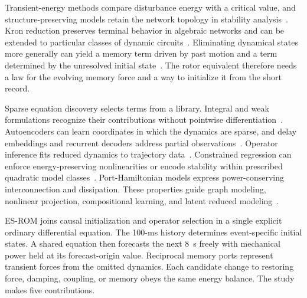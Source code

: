 Transient-energy methods compare disturbance energy with a critical
value, and structure-preserving models retain the network topology in
stability analysis~\cite{athay1979energy,bergen1981structure}. Kron reduction
preserves terminal behavior in algebraic networks and can be extended to
particular classes of dynamic circuits~\cite{dorfler2013kron,caliskan2014kron}.
Eliminating dynamical states more generally can yield a memory term driven
by past motion and a term determined by the unresolved initial
state~\cite{mori1965memory,gouasmi2017memory,pagnier2025kron}. The rotor
equivalent therefore needs a law for the evolving memory force and a way
to initialize it from the short record.

Sparse equation discovery selects terms from a library. Integral and weak
formulations recognize their contributions without pointwise
differentiation~\cite{brunton2016sindy,schaeffer2017integral,messenger2021weak}.
Autoencoders can learn coordinates in which the dynamics are sparse, and
delay embeddings and recurrent decoders address partial
observations~\cite{champion2019coordinates,bakarji2023delay,gao2026shred}.
Operator inference fits reduced dynamics to trajectory data~\cite{peherstorfer2016opinf}. Constrained regression can enforce
energy-preserving nonlinearities or encode stability within prescribed
quadratic model classes~\cite{loiseau2018galerkin,goyal2025quadratic}.
Port-Hamiltonian models express power-conserving interconnection and
dissipation. These properties guide graph modeling, nonlinear projection,
compositional learning, and latent reduced modeling~\cite{vanderschaft2013graphs,chaturantabut2016ph,neary2023compositional,rettberg2025latent}.

ES-ROM joins causal initialization and operator selection in a single
explicit ordinary differential equation. The 100-ms history determines
event-specific initial states. A shared equation then forecasts the next
8~s freely with mechanical power held at its forecast-origin value.
Reciprocal memory ports represent transient forces from the omitted
dynamics. Each candidate change to restoring force, damping, coupling, or
memory obeys the same energy balance. The study makes five contributions.

